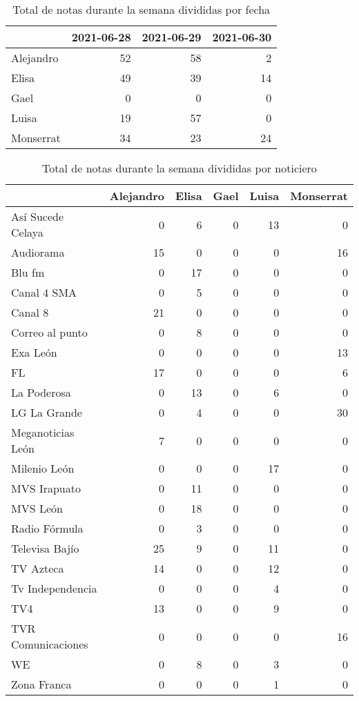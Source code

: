 \documentclass[
]{article}
\begin{document}
\begin{table}

\caption{\label{tab:Notas por fecha}Total de notas durante la semana divididas por fecha}
\centering
\fontsize{10}{12}\selectfont
\begin{tabular}[t]{l|r|r|r}
\hline
  & 2021-06-28 & 2021-06-29 & 2021-06-30\\
\hline
Alejandro & 52 & 58 & 2\\
\hline
Elisa & 49 & 39 & 14\\
\hline
Gael & 0 & 0 & 0\\
\hline
Luisa & 19 & 57 & 0\\
\hline
Monserrat & 34 & 23 & 24\\
\hline
\end{tabular}
\end{table}

\begin{table}

\caption{\label{tab:Notas por noticiero}Total de notas durante la semana divididas por noticiero}
\centering
\fontsize{10}{12}\selectfont
\begin{tabular}[t]{l|r|r|r|r|r}
\hline
  & Alejandro & Elisa & Gael & Luisa & Monserrat\\
\hline
Así Sucede Celaya & 0 & 6 & 0 & 13 & 0\\
\hline
Audiorama & 15 & 0 & 0 & 0 & 16\\
\hline
Blu fm & 0 & 17 & 0 & 0 & 0\\
\hline
Canal 4 SMA & 0 & 5 & 0 & 0 & 0\\
\hline
Canal 8 & 21 & 0 & 0 & 0 & 0\\
\hline
Correo al punto & 0 & 8 & 0 & 0 & 0\\
\hline
Exa León & 0 & 0 & 0 & 0 & 13\\
\hline
FL & 17 & 0 & 0 & 0 & 6\\
\hline
La Poderosa & 0 & 13 & 0 & 6 & 0\\
\hline
LG La Grande & 0 & 4 & 0 & 0 & 30\\
\hline
Meganoticias León & 7 & 0 & 0 & 0 & 0\\
\hline
Milenio León & 0 & 0 & 0 & 17 & 0\\
\hline
MVS Irapuato & 0 & 11 & 0 & 0 & 0\\
\hline
MVS León & 0 & 18 & 0 & 0 & 0\\
\hline
Radio Fórmula & 0 & 3 & 0 & 0 & 0\\
\hline
Televisa Bajío & 25 & 9 & 0 & 11 & 0\\
\hline
TV Azteca & 14 & 0 & 0 & 12 & 0\\
\hline
Tv Independencia & 0 & 0 & 0 & 4 & 0\\
\hline
TV4 & 13 & 0 & 0 & 9 & 0\\
\hline
TVR Comunicaciones & 0 & 0 & 0 & 0 & 16\\
\hline
WE & 0 & 8 & 0 & 3 & 0\\
\hline
Zona Franca & 0 & 0 & 0 & 1 & 0\\
\hline
\end{tabular}
\end{table}
\end{document}
